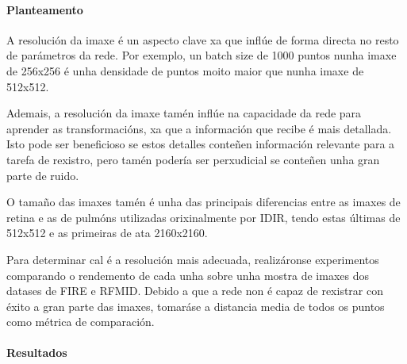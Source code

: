 \paragraph{Planteamento}
\label{par:Planteamento}

A resolución da imaxe é un aspecto clave xa que inflúe de forma directa no resto de parámetros da rede.
Por exemplo, un batch size de 1000 puntos nunha imaxe de 256x256 é unha densidade de puntos moito maior que nunha imaxe de 512x512.

Ademais, a resolución da imaxe tamén inflúe na capacidade da rede para aprender as transformacións, xa que a información que recibe é mais detallada. 
Isto pode ser beneficioso se estos detalles conteñen información relevante para a tarefa de rexistro, pero tamén podería ser perxudicial se conteñen unha gran parte de ruido.

O tamaño das imaxes tamén é unha das principais diferencias entre as imaxes de retina e as de pulmóns utilizadas orixinalmente por IDIR, tendo estas últimas de 512x512 e as primeiras de ata 2160x2160.

Para determinar cal é a resolución mais adecuada, realizáronse experimentos comparando o rendemento de cada unha sobre unha mostra de imaxes dos datases de FIRE e RFMID.
Debido a que a rede non é capaz de rexistrar con éxito a gran parte das imaxes, tomaráse a distancia media de todos os puntos como métrica de comparación.

\paragraph{Resultados}
\label{par:Resultados}

